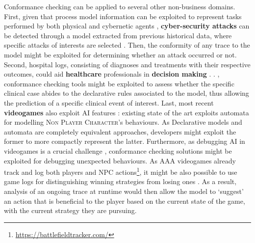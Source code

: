 {Conformance checking can be applied to several other non-business domains.} 
 First, given that process model information can be exploited to represent 
  tasks performed by both physical and cybernetic agents \cite{Ioanna}, %
   \textbf{cyber-security attacks} can be detected through a model extracted from previous historical data, where specific attacks of interests are selected \cite{BENASHER201551,LagraaS20}. Then, the conformity of any trace to the model might be exploited for determining whether an attack occurred or not. Second,  hospital logs, consisting of diagnoses and treatments with their respective outcomes, could aid \textbf{healthcare} professionals in  \textbf{decision making} \cite{Amantea2020}.  \cite{mining,KusumaKMHGJ20}. , conformance checking tools might be exploited to assess whether the specific clinical case abides to the declarative rules associated to the model, thus allowing the prediction of a specific clinical event of interest. Last, most recent \textbf{videogames} also exploit AI features \cite{LiGT21}: existing state of the art exploits automata \cite{Miyake2017} for modelling \textsc{Non Player Character}'s behaviours. As Declarative models and automata are completely equivalent approaches, developers might exploit the former to more compactly represent the latter. Furthermore, as debugging AI in videogames is a crucial challenge \cite{john2019debugging}, conformance checking solutions might be exploited for debugging unexpected behaviours. As AAA videogames already  track and log both players and NPC actions\footnote{\url{https://battlefieldtracker.com/}}, it might be also possible to use game logs for distinguishing winning strategies from losing ones \cite{mining}. As a result, analysis of an ongoing trace at runtime would then allow the model to `suggest' an action that is beneficial to the player based on the current state of the game, with the current strategy they are pursuing.

